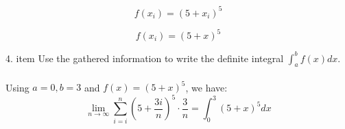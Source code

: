 \begin{framed}
  \begin{equation*}
    f(x_i) = (5+x_i)^5
  \end{equation*}

  \begin{equation*}
    f(x_i) = (5+x)^5
  \end{equation*}

  4. item Use the gathered information to write the definite integral 
        $\int_a^b f(x)dx$.\\\\
  Using $a = 0, b = 3$ and $f(x) = (5+x)^5$, we have:\\
  \begin{equation*}
    \lim_{n \to \infty} \sum_{i=i}^{n} \left(5+\frac{3i}{n}\right)^5\cdot 
    \frac{3}{n} = \int_0^3 (5+x)^5 dx
  \end{equation*}
\end{framed}